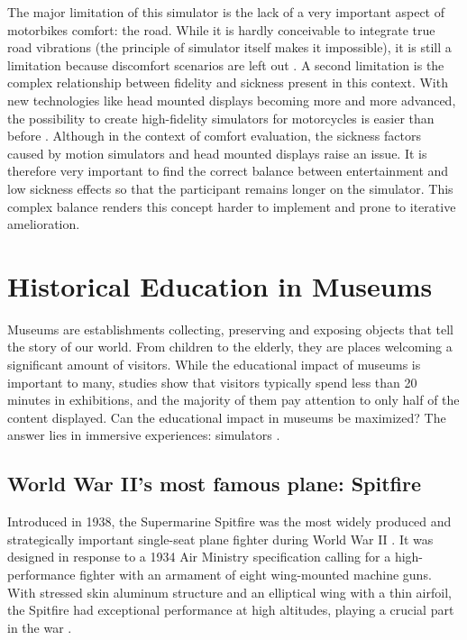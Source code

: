 \documentclass[authoryear,preprint]{sigplanconf}
\begin{document}
The major limitation of this simulator is the lack of a very important aspect of motorbikes comfort: the road. While it is hardly conceivable to integrate true road vibrations (the principle of simulator itself makes it impossible), it is still a limitation because discomfort scenarios are left out \cite{BumpRoad}.
A second limitation is the complex relationship between fidelity and sickness \cite{RelationFS} present in this context. With new technologies like head mounted displays becoming more and more advanced, the possibility to create high-fidelity simulators for motorcycles is easier than before \cite{Cruden}. Although in the context of comfort evaluation, the sickness factors caused by motion simulators and head mounted displays raise an issue. It is therefore very important to find the correct balance between entertainment and low sickness effects so that the participant remains longer on the simulator. This complex balance renders this concept harder to implement and prone to iterative amelioration.

\section{Historical Education in Museums}

Museums are establishments collecting, preserving and exposing objects that tell the story of our world. From children to the elderly, they are places welcoming a significant amount of visitors. While the educational impact of museums is important to many, studies \cite{Mattention} show that visitors typically spend less than 20 minutes in exhibitions, and the majority of them pay attention to only half of the content displayed. Can the educational impact in museums be maximized? The answer lies in immersive experiences: simulators \cite{ImmerEmo} \cite{HistoryImm}.

\subsection{World War II's most famous plane: Spitfire}

Introduced in 1938, the Supermarine Spitfire was the most widely produced and strategically important single-seat plane fighter during World War II \cite{Spitfire}. It was designed in response to a 1934 Air Ministry specification calling for a high-performance fighter with an armament of eight wing-mounted machine guns. With stressed skin aluminum structure and an elliptical wing with a thin airfoil, the Spitfire had exceptional performance at high altitudes, playing a crucial part in the war \cite{SpitfireGood}.
\end{document}
